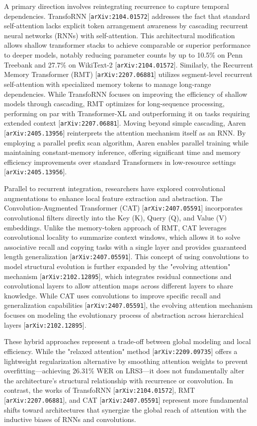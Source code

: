 \documentclass[11pt]{article}
\begin{document}
A primary direction involves reintegrating recurrence to capture temporal dependencies. TransfoRNN [\texttt{arXiv:2104.01572}] addresses the fact that standard self-attention lacks explicit token arrangement awareness by cascading recurrent neural networks (RNNs) with self-attention. This architectural modification allows shallow transformer stacks to achieve comparable or superior performance to deeper models, notably reducing parameter counts by up to 10.5\% on Penn Treebank and 27.7\% on WikiText-2 [\texttt{arXiv:2104.01572}]. Similarly, the Recurrent Memory Transformer (RMT) [\texttt{arXiv:2207.06881}] utilizes segment-level recurrent self-attention with specialized memory tokens to manage long-range dependencies. While TransfoRNN focuses on improving the efficiency of shallow models through cascading, RMT optimizes for long-sequence processing, performing on par with Transformer-XL and outperforming it on tasks requiring extended context [\texttt{arXiv:2207.06881}]. Moving beyond simple cascading, Aaren [\texttt{arXiv:2405.13956}] reinterprets the attention mechanism itself as an RNN. By employing a parallel prefix scan algorithm, Aaren enables parallel training while maintaining constant-memory inference, offering significant time and memory efficiency improvements over standard Transformers in low-resource settings [\texttt{arXiv:2405.13956}].

Parallel to recurrent integration, researchers have explored convolutional augmentations to enhance local feature extraction and abstraction. The Convolution-Augmented Transformer (CAT) [\texttt{arXiv:2407.05591}] incorporates convolutional filters directly into the Key (K), Query (Q), and Value (V) embeddings. Unlike the memory-token approach of RMT, CAT leverages convolutional locality to summarize context windows, which allows it to solve associative recall and copying tasks with a single layer and provides guaranteed length generalization [\texttt{arXiv:2407.05591}]. This concept of using convolutions to model structural evolution is further expanded by the "evolving attention" mechanism [\texttt{arXiv:2102.12895}], which integrates residual connections and convolutional layers to allow attention maps across different layers to share knowledge. While CAT uses convolutions to improve specific recall and generalization capabilities [\texttt{arXiv:2407.05591}], the evolving attention mechanism focuses on modeling the evolutionary process of abstraction across hierarchical layers [\texttt{arXiv:2102.12895}].

These hybrid approaches represent a trade-off between global modeling and local efficiency. While the "relaxed attention" method [\texttt{arXiv:2209.09735}] offers a lightweight regularization alternative by smoothing attention weights to prevent overfitting—achieving 26.31\% WER on LRS3—it does not fundamentally alter the architecture's structural relationship with recurrence or convolution. In contrast, the works of TransfoRNN [\texttt{arXiv:2104.01572}], RMT [\texttt{arXiv:2207.06881}], and CAT [\texttt{arXiv:2407.05591}] represent more fundamental shifts toward architectures that synergize the global reach of attention with the inductive biases of RNNs and convolutions.
\end{document}
